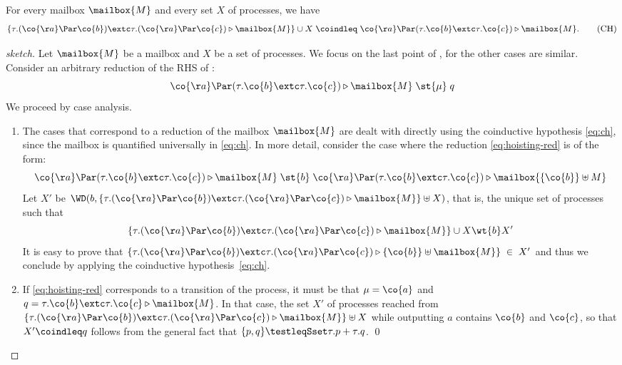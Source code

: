 \begin{lemma}
  For every mailbox $\mailbox{M}$ and every set $X$ of processes, we have
\begin{equation}
   \label{eq:ch}
   \{ \tau.(\co{\aa} \Par \co{b}) \extc
   \tau.(\co{\aa} \Par \co{c}) \triangleright \mailbox{M} \} \cup X \;\coindleq\; \co{\aa} \Par (\tau.\co{b} \extc
   \tau.\co{c}) \triangleright \mailbox{M}.
   \tag{CH}
\end{equation}
\end{lemma}
%
\begin{proof}[sketch]
Let $\mailbox{M}$ be a mailbox and $X$ be a set of processes.
%
We focus on the last point of , for the other cases
are similar.
%
Consider an arbitrary reduction of the RHS of :
  \begin{equation}
    \label{eq:hoisting-red}
  \co{\aa} \Par (\tau.\co{b} \extc \tau.\co{c}) \triangleright \mailbox{M}
  \;\st{\mu}\; \serverB
  \end{equation}
We proceed by case analysis.
  \begin{enumerate}
\item%
The cases that correspond to a reduction of the mailbox $\mailbox{M}$
are dealt with directly using the coinductive hypothesis \eqref{eq:ch},
since the mailbox is quantified universally in \eqref{eq:ch}.
%
In more detail, consider the case where the reduction \eqref{eq:hoisting-red} is of the form:
\begin{equation*}
\co{\aa} \Par (\tau.\co{b} \extc \tau.\co{c}) \triangleright \mailbox{M}
\;\st{b}\; \co{\aa} \Par (\tau.\co{b} \extc \tau.\co{c}) \triangleright
  \mailbox{\{ \co{b} \} \uplus M}
\end{equation*}
%
      Let $X'$ be $\WD(b, \{ \tau.(\co{\aa} \Par \co{b}) \extc \tau.(\co{\aa} \Par
      \co{c}) \triangleright \mailbox{M} \} \uplus X)$, that is, the unique set of processes such that
\[
  \{ \tau.(\co{\aa} \Par \co{b}) \extc \tau.(\co{\aa} \Par \co{c}) \triangleright \mailbox{M} \} \cup X
      \wt{b} X'
\]
%
It is easy to prove that 
\(
  \{ \tau.(\co{\aa} \Par \co{b}) \extc \tau.(\co{\aa} \Par \co{c})
      \triangleright \{ \co{b} \} \uplus \mailbox{M} \} \;\in\; X'
\)
and thus we conclude by applying the coinductive hypothesis~\eqref{eq:ch}.
\item
If \eqref{eq:hoisting-red} corresponds to a transition of the process,
it must be that $\mu = \co{a}$ and $q = \tau.\co{b} \extc
\tau.\co{c} \triangleright \mailbox{M}$.
%
In that case, the set $X'$ of processes reached from
$\{ \tau.(\co{\aa} \Par \co{b}) \extc \tau.(\co{\aa} \Par \co{c})
\triangleright \mailbox{M} \} \uplus X$ while outputting $a$
contains $\co{b}$ and $\co{c}$, so that $X' \coindleq q$ follows from
the general fact that $\{p, q\} \testleqSset \tau. p + \tau. q$. \qed

\end{enumerate}
\end{proof}


